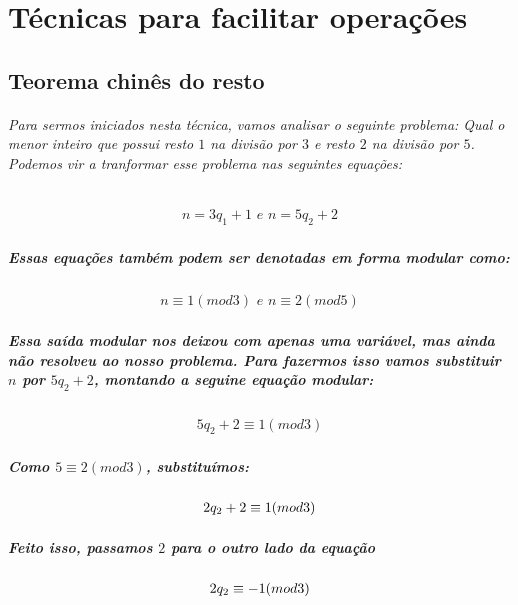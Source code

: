 \chapter {T\'ecnicas para facilitar opera\c{c}\~oes}
\label{TCR}

\section{Teorema chin\^es do resto}

\subparagraph{
Para sermos iniciados nesta t\'ecnica, vamos analisar o seguinte problema: Qual o menor inteiro que possui resto $1$ na divis\~ao por $3$ e resto $2$ na divis\~ao por $5$. Podemos vir a tranformar esse problema nas seguintes equa\c{c}\~oes:
}
\[	
	\begin{array}{c}
		\textit{$n = 3q_1 + 1$ e $n = 5q_2 + 2$}
	\end{array}
\]
\paragraph{
Essas equa\c{c}\~oes tamb\'em podem ser denotadas em forma modular como:
}
\[	
	\begin{array}{c}
		\textit{$n \equiv 1 (mod 3)$ e $n \equiv 2 (mod 5)$}
	\end{array}
\]
\paragraph{
Essa sa\'ida modular nos deixou com apenas uma vari\'avel, mas ainda n\~ao resolveu ao nosso problema. Para fazermos isso vamos substituir $n$ por $5q_2 + 2$, montando a seguine equa\c{c}\~ao modular:
}
\[	
	\begin{array}{c}
		\textit{$5q_2 + 2 \equiv 1 (mod 3)$}
	\end{array}
\]
\paragraph{
Como $5 \equiv 2(mod 3)$, substitu\'imos:
}
\[	
	\begin{array}{c}
		\textit{$ 2q_2 + 2 \equiv 1 (mod 3)$}
	\end{array}
\]
\paragraph{
Feito isso, passamos $2$ para o outro lado da equa\c{c}\~ao
}
\[	
	\begin{array}{c}
		\textit{$ 2q_2  \equiv -1 (mod 3)$}
	\end{array}
\]
